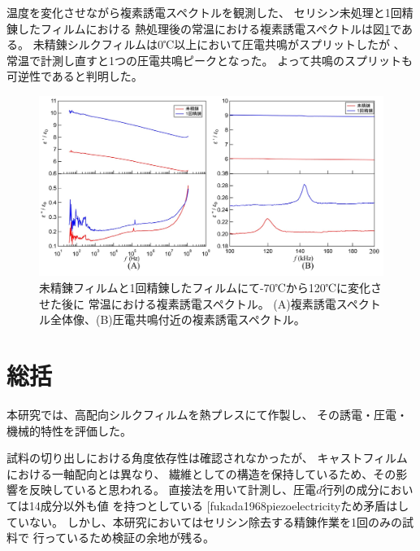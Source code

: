 \documentclass[dvipdfmx,12pt,a4paper]{jreport}
\makeatletter
\DeclareRobustCommand\cite{\unskip
    	\@ifnextchar[{\@tempswatrue\@citex}{\@tempswafalse\@citex[]}}
\makeatother
\begin{document}
			\newpage
			温度を変化させながら複素誘電スペクトルを観測した、
			セリシン未処理と1回精錬したフィルムにおける
			熱処理後の常温における複素誘電スペクトルは図\ref{未精錬_1回精錬_熱処理後}である。
			未精錬シルクフィルムは0℃以上において圧電共鳴がスプリットしたが
			、常温で計測し直すと1つの圧電共鳴ピークとなった。
			よって共鳴のスプリットも可逆性であると判明した。
			\begin{figure}[h]
				\centering
				\includegraphics[width=\linewidth]{0_1_回_精錬_熱処理前後.jpg}
				\caption{未精錬フィルムと1回精錬したフィルムにて-70℃から120℃に変化させた後に
				常温における複素誘電スペクトル。
				(A)複素誘電スペクトル全体像、(B)圧電共鳴付近の複素誘電スペクトル。}
				\label{未精錬_1回精錬_熱処理後}
			\end{figure}
	\chapter{総括}
	
	本研究では、高配向シルクフィルムを熱プレスにて作製し、
	その誘電・圧電・機械的特性を評価した。
	
	試料の切り出しにおける角度依存性は確認されなかったが、
	キャストフィルムにおける一軸配向とは異なり、
	繊維としての構造を保持しているため、その影響を反映していると思われる。
	直接法を用いて計測し、圧電$d$行列の成分においては14成分以外も値
	を持つとしている\cite{fukada1968piezoelectricity}ため矛盾はしていない。
	しかし、本研究においてはセリシン除去する精錬作業を1回のみの試料で
	行っているため検証の余地が残る。
\end{document}
